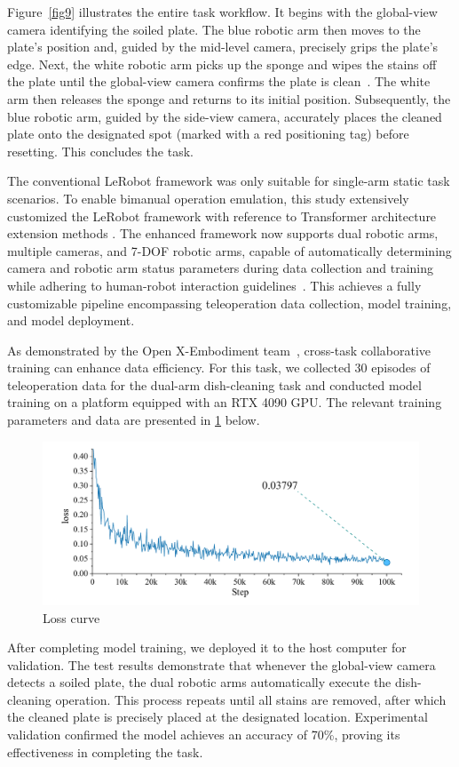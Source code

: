 \documentclass[runningheads]{llncs}
\begin{document}
Figure~\ref{fig9} illustrates the entire task workflow. It begins with the global-view camera identifying the soiled plate. The blue robotic arm then moves to the plate's position and, guided by the mid-level camera, precisely grips the plate's edge. Next, the white robotic arm picks up the sponge and wipes the stains off the plate until the global-view camera confirms the plate is clean~\cite{fu_deep_2022}. The white arm then releases the sponge and returns to its initial position. Subsequently, the blue robotic arm, guided by the side-view camera, accurately places the cleaned plate onto the designated spot (marked with a red positioning tag) before resetting. This concludes the task.


The conventional LeRobot framework was only suitable for single-arm static task scenarios. To enable bimanual operation emulation, this study extensively customized the LeRobot framework with reference to Transformer architecture extension methods . The enhanced framework now supports dual robotic arms, multiple cameras, and 7-DOF robotic arms, capable of automatically determining camera and robotic arm status parameters during data collection and training while adhering to human-robot interaction guidelines~\cite{ref15}. This achieves a fully customizable pipeline encompassing teleoperation data collection, model training, and model deployment.


As demonstrated by the Open X-Embodiment team~\cite{ref16}, cross-task collaborative training can enhance data efficiency. For this task, we collected 30 episodes of teleoperation data for the dual-arm dish-cleaning task and conducted model training on a platform equipped with an RTX 4090 GPU. The relevant training parameters and data are presented in \cref{fig19} below.


\begin{figure}
\centering
\includegraphics[width=323pt]{fig8.pdf}
\caption{Loss curve} \label{fig19}
\end{figure}


After completing model training, we deployed it to the host computer for validation. The test results demonstrate that whenever the global-view camera detects a soiled plate, the dual robotic arms automatically execute the dish-cleaning operation. This process repeats until all stains are removed, after which the cleaned plate is precisely placed at the designated location. Experimental validation confirmed the model achieves an accuracy of 70\%, proving its effectiveness in completing the task.
\end{document}

